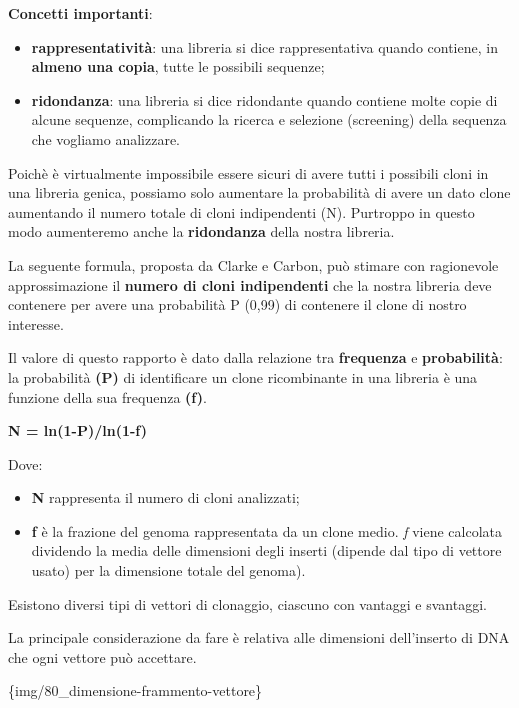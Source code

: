 \documentclass[11pt]{book}
\begin{document}
\textbf{Concetti importanti}:

\begin{itemize}
\itemsep1pt\parskip0pt
\item
  \textbf{rappresentatività}: una libreria si dice rappresentativa
  quando contiene, in \textbf{almeno una copia}, tutte le possibili
  sequenze;
\item
  \textbf{ridondanza}: una libreria si dice ridondante quando contiene
  molte copie di alcune sequenze, complicando la ricerca e selezione
  (screening) della sequenza che vogliamo analizzare.
\end{itemize}

Poichè è virtualmente impossibile essere sicuri di avere tutti i
possibili cloni in una libreria genica, possiamo solo aumentare la
probabilità di avere un dato clone aumentando il numero totale di cloni
indipendenti (N). Purtroppo in questo modo aumenteremo anche la
\textbf{ridondanza} della nostra libreria.

La seguente formula, proposta da Clarke e Carbon, può stimare con
ragionevole approssimazione il \textbf{numero di cloni indipendenti} che
la nostra libreria deve contenere per avere una probabilità P (0,99) di
contenere il clone di nostro interesse.

Il valore di questo rapporto è dato dalla relazione tra
\textbf{frequenza} e \textbf{probabilità}: la probabilità \textbf{(P)}
di identificare un clone ricombinante in una libreria è una funzione
della sua frequenza \textbf{(f)}.

\textbf{N = ln(1-P)/ln(1-f)}

Dove:

\begin{itemize}
\itemsep1pt\parskip0pt
\item
  \textbf{N} rappresenta il numero di cloni analizzati;
\item
  \textbf{f} è la frazione del genoma rappresentata da un clone medio.
  \emph{f} viene calcolata dividendo la media delle dimensioni degli
  inserti (dipende dal tipo di vettore usato) per la dimensione totale
  del genoma).
\end{itemize}

Esistono diversi tipi di vettori di clonaggio, ciascuno con vantaggi e
svantaggi.

La principale considerazione da fare è relativa alle dimensioni
dell'inserto di DNA che ogni vettore può accettare.

\{img/80\_dimensione-frammento-vettore\}
\end{document}
